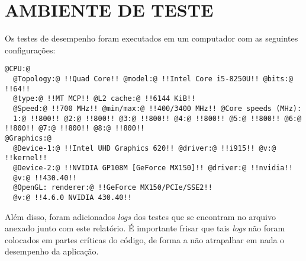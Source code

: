 \section{\normalsize AMBIENTE DE TESTE}
	Os testes de desempenho foram executados em um computador com as seguintes configurações:
	\begin{lstlisting}[frame=single,style=base]
@CPU:@
  @Topology:@ !!Quad Core!! @model:@ !!Intel Core i5-8250U!! @bits:@ !!64!! 
  @type:@ !!MT MCP!! @L2 cache:@ !!6144 KiB!! 
  @Speed:@ !!700 MHz!! @min/max:@ !!400/3400 MHz!! @Core speeds (MHz): 
  1:@ !!800!! @2:@ !!800!! @3:@ !!800!! @4:@ !!800!! @5:@ !!800!! @6:@ !!800!! @7:@ !!800!! @8:@ !!800!! 
@Graphics:@
  @Device-1:@ !!Intel UHD Graphics 620!! @driver:@ !!i915!! @v:@ !!kernel!! 
  @Device-2:@ !!NVIDIA GP108M [GeForce MX150]!! @driver:@ !!nvidia!! 
  @v:@ !!430.40!!
  @OpenGL: renderer:@ !!GeForce MX150/PCIe/SSE2!! 
  @v:@ !!4.6.0 NVIDIA 430.40!! 
    \end{lstlisting}
    
    Além disso, foram adicionados \textit{logs} dos testes que se encontram no arquivo anexado junto com este relatório. É importante frisar que tais \textit{logs} não foram colocados em partes críticas do código, de forma a não atrapalhar em nada o desempenho da aplicação.